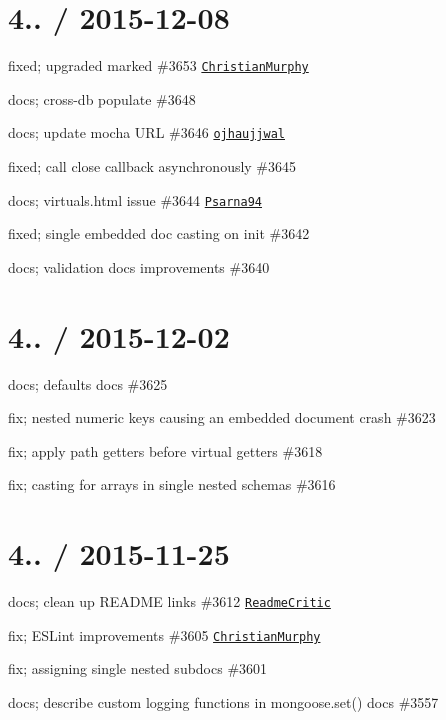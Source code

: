 \section*{4.. / 2015-\/12-\/08 }


\begin{DoxyItemize}
\item fixed; upgraded marked \#3653 \href{https://github.com/ChristianMurphy}{\tt Christian\+Murphy}
\item docs; cross-\/db populate \#3648
\item docs; update mocha U\+RL \#3646 \href{https://github.com/ojhaujjwal}{\tt ojhaujjwal}
\item fixed; call close callback asynchronously \#3645
\item docs; virtuals.\+html issue \#3644 \href{https://github.com/Psarna94}{\tt Psarna94}
\item fixed; single embedded doc casting on init \#3642
\item docs; validation docs improvements \#3640
\end{DoxyItemize}

\section*{4.. / 2015-\/12-\/02 }


\begin{DoxyItemize}
\item docs; defaults docs \#3625
\item fix; nested numeric keys causing an embedded document crash \#3623
\item fix; apply path getters before virtual getters \#3618
\item fix; casting for arrays in single nested schemas \#3616
\end{DoxyItemize}

\section*{4.. / 2015-\/11-\/25 }


\begin{DoxyItemize}
\item docs; clean up R\+E\+A\+D\+ME links \#3612 \href{https://github.com/ReadmeCritic}{\tt Readme\+Critic}
\item fix; E\+S\+Lint improvements \#3605 \href{https://github.com/ChristianMurphy}{\tt Christian\+Murphy}
\item fix; assigning single nested subdocs \#3601
\item docs; describe custom logging functions in {\ttfamily mongoose.\+set()} docs \#3557
\end{DoxyItemize}

